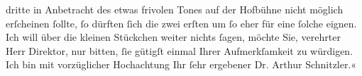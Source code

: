                dritte in Anbetracht des etwas frivolen Tones auf der Hofbühne nicht möglich erſcheinen ſollte, ſo dürften ſich
               die zwei erſten um ſo eher für eine ſolche eignen. Ich will über die kleinen
               Stückchen weiter nichts ſagen, möchte Sie, verehrter Herr Direktor, nur bitten, ſie
               gütigſt einmal Ihrer Aufmerkſamkeit zu würdigen. Ich bin mit vorzüglicher Hochachtung
               Ihr ſehr ergebener Dr. Arthur Schnitzler.«\pend
           \endnumbering{}  
      